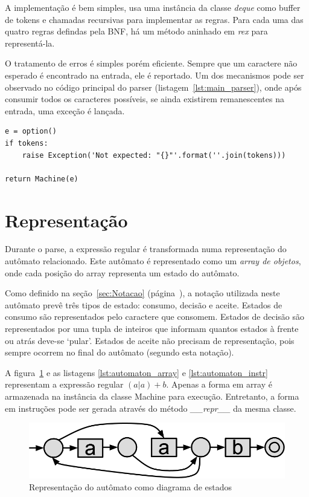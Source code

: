\documentclass[a4paper,12pt,oneside,onecolumn]{uerj}
\begin{document}
A implementação é bem simples, usa uma instância da classe \emph{deque} como buffer de tokens e chamadas recursivas para implementar as regras. Para cada uma das quatro regras defindas pela BNF, há um método aninhado em \emph{rex} para representá-la.

O tratamento de erros é simples porém eficiente. Sempre que um caractere não esperado é encontrado na entrada, ele é reportado. Um dos mecanismos pode ser observado no código principal do parser (listagem~\ref{lst:main_parser}), onde após consumir todos os caracteres possíveis, se ainda existirem remanescentes na entrada, uma exceção é lançada.

\vspace{0.5cm}
\begin{lstlisting}[caption={Exemplo de tratamento de erros no parser},label=lst:main_parser]
e = option()
if tokens: 
    raise Exception('Not expected: "{}"'.format(''.join(tokens)))

return Machine(e)
\end{lstlisting}

\section{Representação}

Durante o parse, a expressão regular é transformada numa representação do autômato relacionado. Este autômato é representado como um \emph{array de objetos}, onde cada posição do array representa um estado do autômato.

Como definido na seção~\ref{sec:Notacao} (página~\pageref{sec:Notacao}), a notação utilizada neste autômato prevê três tipos de estado: consumo, decisão e aceite. Estados de consumo são representados pelo caractere que consomem. Estados de decisão são representados por uma tupla de inteiros que informam quantos estados à frente ou atrás deve-se `pular'. Estados de aceite não precisam de representação, pois sempre ocorrem no final do autômato (segundo esta notação).

A figura~\ref{fig:exemplo_automato_puro} e as listagens \ref{lst:automaton_array} e \ref{lst:automaton_instr} representam a expressão regular $(a|a)+b$. Apenas a forma em array é armazenada na instância da classe Machine para execução. Entretanto, a forma em instruções pode ser gerada através do método \emph{\_\_repr\_\_} da mesma classe.

\begin{figure}[ht]
  \centering
  \includegraphics[scale=0.4]{figures/exemplo_automato_puro.png}
  \caption{Representação do autômato como diagrama de estados}
  \label{fig:exemplo_automato_puro}
\end{figure}
\end{document}
